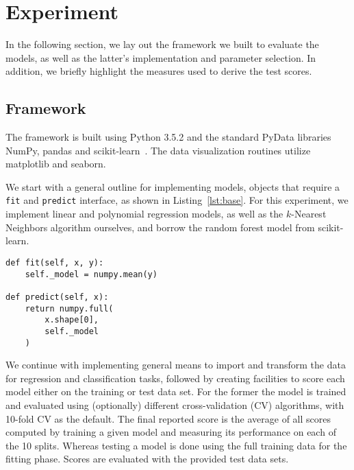 \section{Experiment}
\label{sec:three}

In the following section, we lay out the framework we built to evaluate the
models, as well as the latter's implementation and parameter selection.  In
addition, we briefly highlight the measures used to derive the test scores.

\subsection{Framework}

The framework is built using Python 3.5.2 and the standard PyData libraries
NumPy, pandas and
scikit-learn~\cite{sklearn:2011}.  The data
visualization routines utilize matplotlib and
seaborn.

We start with a general outline for implementing models, objects that require a
\texttt{fit} and \texttt{predict} interface, as shown in Listing~\ref{lst:base}.
For this experiment, we implement linear and polynomial regression models, as
well as the $k$-Nearest Neighbors algorithm ourselves, and borrow the random
forest model from scikit-learn.

\begin{lstlisting}
def fit(self, x, y):
    self._model = numpy.mean(y)

def predict(self, x):
    return numpy.full(
        x.shape[0],
        self._model
    )
\end{lstlisting}

We continue with implementing general means to import and transform the data for
regression and classification tasks, followed by creating facilities to score
each model either on the training or test data set.  For the former the model is
trained and evaluated using (optionally) different cross-validation (CV)
algorithms, with 10-fold CV as the default.  The final reported score is the
average of all scores computed by training a given model and measuring its
performance on each of the 10 splits.  Whereas testing a model is done using the
full training data for the fitting phase.  Scores are evaluated with the
provided test data sets.

